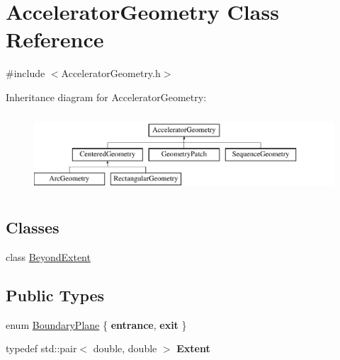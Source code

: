 \hypertarget{classAcceleratorGeometry}{}\section{Accelerator\+Geometry Class Reference}
\label{classAcceleratorGeometry}


{\ttfamily \#include $<$Accelerator\+Geometry.\+h$>$}

Inheritance diagram for Accelerator\+Geometry\+:\begin{figure}[H]
\begin{center}
\leavevmode
\includegraphics[height=2.957747cm]{classAcceleratorGeometry}
\end{center}
\end{figure}
\subsection*{Classes}
\begin{DoxyCompactItemize}
\item 
class \hyperlink{classAcceleratorGeometry_1_1BeyondExtent}{Beyond\+Extent}
\end{DoxyCompactItemize}
\subsection*{Public Types}
\begin{DoxyCompactItemize}
\item 
enum \hyperlink{classAcceleratorGeometry_a5c1661938176102f235836f5a8be6034}{Boundary\+Plane} \{ {\bfseries entrance}, 
{\bfseries exit}
 \}
\item 
\mbox{\label{classAcceleratorGeometry_a8d2b94993161c0b2e4e6488ddd534b7f}} 
typedef std\+::pair$<$ double, double $>$ {\bfseries Extent}
\end{DoxyCompactItemize}
